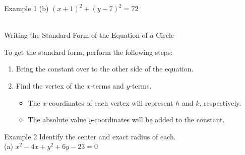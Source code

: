 \documentclass[t]{beamer}
\begin{document}
\begin{frame}{Example 1}
(b)	\quad	$(x+1)^2 + (y-7)^2 = 72$	\newline\\
	\newline\\
 
\end{frame}

\begin{frame}{Writing the Standard Form of the Equation of a Circle}

To get the standard form, perform the following steps:	\newline\\	
\begin{enumerate}
    \item Bring the constant over to the other side of the equation.	\newline\\ \pause
    \item Find the vertex of the $x$-terms and $y$-terms. \newline\\ \pause
        \begin{itemize}
            \item The $x$-coordinates of each vertex will represent $h$ and $k$, respectively.	\newline\\ \pause
            \item The absolute value $y$-coordinates will be added to the constant.
        \end{itemize}
\end{enumerate}
\end{frame}

\begin{frame}{Example 2}
Identify the center and exact radius of each.	\newline\\
(a)	\quad	$x^2-4x+y^2+6y-23=0$	
	\qquad
{}	
	\\
\end{frame}
\end{document}

